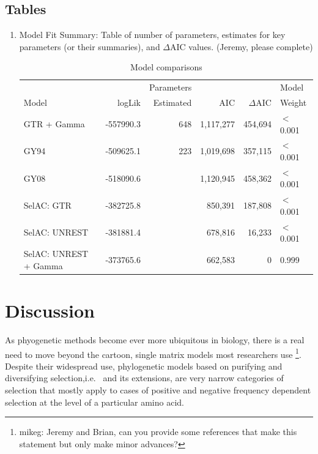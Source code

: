 \documentclass{article}
\newcommand{\DeltaAIC}{\ensuremath{\Delta\text{AIC}}\xspace}
\begin{document}
\subsection*{Tables}
\begin{enumerate}
\item Model Fit Summary:
  Table of number of parameters,
  estimates for key parameters (or their summaries), and \DeltaAIC
  values.
  (Jeremy, please complete)
  \begin{table}
    \begin{tabular}{lrrrrl}
      &          &Parameters &          &        & Model\\
      Model                 & logLik   & Estimated &     AIC& \DeltaAIC&  Weight\\\hline
      GTR + Gamma           & -557990.3&        648& 1,117,277& 454,694&$<$0.001\\
      GY94                  & -509625.1&        223& 1,019,698& 357,115&$<$0.001\\
      GY08                  & -518090.6&           & 1,120,945& 458,362&$<$0.001\\
      SelAC: GTR            & -382725.8&           &   850,391& 187,808&$<$0.001\\
      SelAC: UNREST         & -381881.4&           &   678,816&  16,233&$<$0.001\\
      SelAC: UNREST + Gamma & -373765.6&           &   662,583&       0& 0.999
    \end{tabular}
    \caption{Model comparisons}\label{table:modelFits}
  \end{table}
\end{enumerate}
\section*{Discussion}
As phyogenetic methods become ever more ubiquitous in biology, there is a real need to move beyond the cartoon, single matrix models most researchers use \citep{GoldmanEtAl1996,ThorneEtAl1996,GoldmanEtAl1998,HalpernAndBruno1998}
  \footnote{mikeg: Jeremy and Brian, can you provide some references that make this statement but only make minor advances?}.
Despite their widespread use, phylogenetic models based on purifying and diversifying selection,i.e.~\citet{GoldmanAndYang1994} and its extensions, are very narrow categories of selection that mostly apply to cases of positive and negative frequency dependent selection at the level of a particular amino acid.
\end{document}
